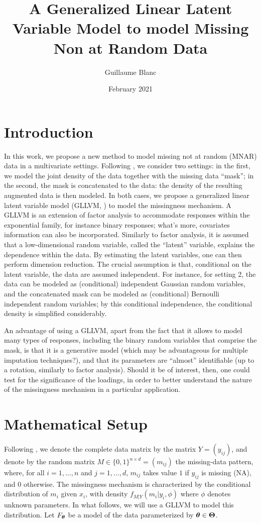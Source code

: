 \documentclass{article}
\title{A Generalized Linear Latent Variable Model to model Missing Non at Random Data}
\author{Guillaume Blanc}
\date{February 2021}
\begin{document}
\maketitle
\section{Introduction}
In this work, we propose a new method to model missing not at random (MNAR) data in a multivariate settings. Following \textcite{sportisse_imputation_2020}, we consider two settings: in the first, we model the joint density of the data together with the missing data ``mask''; in the second, the mask is concatenated to the data: the density of the resulting augmented data is then modeled. In both cases, we propose a generalized linear latent variable model (GLLVM, \cite{skrondal_generalized_2004}) to model the missingness mechanism. A GLLVM is an extension of factor analysis to accommodate responses within the exponential family, for instance binary responses; what's more, covariates information can also be incorporated. Similarly to factor analysis, it is assumed that a low-dimensional random variable, called the ``latent'' variable, explains the dependence within the data. By estimating the latent variables, one can then perform dimension reduction. The crucial assumption is that, conditional on the latent variable, the data are assumed independent. For instance, for setting 2, the data can be modeled as (conditional) independent Gaussian random variables, and the concatenated mask can be modeled as (conditional) Bernoulli independent random variables; by this conditional independence, the conditional density is simplified considerably.

An advantage of using a GLLVM, apart from the fact that it allows to model many types of responses, including the binary random variables that comprise the mask, is that it is a generative model (which may be advantageous for multiple imputation techniques?), and that its parameters are ``almost'' identifiable (up to a rotation, similarly to factor analysis). Should it be of interest, then, one could test for the significance of the loadings, in order to better understand the nature of the missingness mechanism in a particular application.

\section{Mathematical Setup}
Following \textcite{little_statistical_2019}, we denote the complete data matrix  by the matrix $Y=(y_{ij})$, and denote by the random matrix $M \in \{0, 1\}^{n\times d} = (m_{ij})$ the missing-data pattern, where, for all $i=1, \dots, n$ and $j=1,  \dots, d$,  $m_{ij}$ takes value $1$ if $y_{ij}$ is missing (NA), and $0$ otherwise. The missingness mechanism is characterized by the conditional distribution of $m_i$ given $x_i$, with density $f_{M|Y}(m_i|y_i, \phi)$ where $\phi$ denotes unknown parameters. In what follows, we will use a GLLVM to model this distribution.
Let $F_{\bm{\theta}}$ be a model of the data parameterized by ${\bm{\theta}}\in\bm\Theta$.
\end{document}
